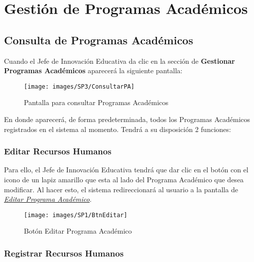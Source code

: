 
\chapter{Gestión de Programas Académicos}
    \section{Consulta de Programas Académicos}
        Cuando el Jefe de Innovación Educativa da clic en la sección de \textbf{Gestionar Programas Académicos} aparecerá la siguiente pantalla:
        
        
        \begin{figure}[!hbtp]
        	\centering
        	\hypertarget{consultarpa}{\texttt{[image: images/SP3/ConsultarPA]}}
        	\caption{Pantalla para consultar Programas Académicos}
        	\label{consultarpa}
        \end{figure}

        En donde aparecerá, de forma predeterminada, todos los Programas Académicos  registrados en el sistema al momento. Tendrá a su disposición 2 funciones:

	    \subsection{Editar Recursos Humanos}

        	Para ello, el Jefe de Innovación Educativa tendrá que dar clic en el botón con el icono de un lapiz amarillo que esta al lado del Programa Académico que desea modificar. Al hacer esto, el sistema redireccionará al usuario a la pantalla de \hyperlink{editarpa}{\textit{Editar Programa Académico}}.
        
        	\begin{figure}[!hbtp]
        		\centering
        		\hypertarget{editar}{\texttt{[image: images/SP1/BtnEditar]}}
        		\caption{Botón Editar Programa Académico}
        		\label{editar}
        	\end{figure}
    \newpage

    	\subsection{Registrar Recursos Humanos}

